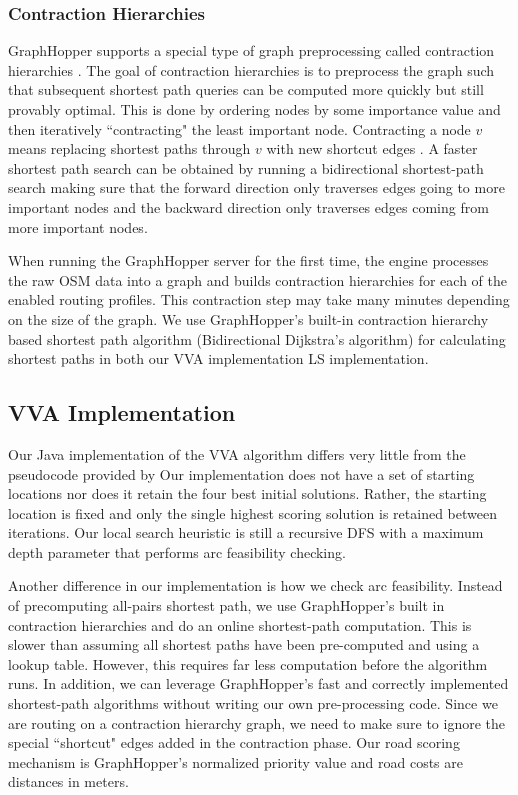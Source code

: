 \documentclass[honors]{union-cs-thesis}
\begin{document}
\subsubsection{Contraction Hierarchies}
GraphHopper supports a special type of graph preprocessing called contraction hierarchies \cite{graphhopper}. The goal of contraction hierarchies is to preprocess the graph such that subsequent shortest path queries can be computed more quickly but still provably optimal. This is done by ordering nodes by some importance value and then iteratively ``contracting" the least important node. Contracting a node $v$ means replacing shortest paths through $v$ with new shortcut edges \cite{geisberger2008contraction}. A faster shortest path search can be obtained by running a bidirectional shortest-path search making sure that the forward direction only traverses edges going to more important nodes and the backward direction only traverses edges coming from more important nodes.

When running the GraphHopper server for the first time, the engine processes the raw OSM data into a graph and builds contraction hierarchies for each of the enabled routing profiles. This contraction step may take many minutes depending on the size of the graph. We use GraphHopper's built-in contraction hierarchy based shortest path algorithm (Bidirectional Dijkstra's algorithm) for calculating shortest paths in both our VVA implementation LS implementation.

\subsection{VVA Implementation}
Our Java implementation of the VVA algorithm differs very little from the pseudocode provided by \citeauthor{verbeeck2014extension} Our implementation does not have a set of starting locations nor does it retain the four best initial solutions. Rather, the starting location is fixed and only the single highest scoring solution is retained between iterations. Our local search heuristic is still a recursive DFS with a maximum depth parameter that performs arc feasibility checking.

Another difference in our implementation is how we check arc feasibility. Instead of precomputing all-pairs shortest path, we use GraphHopper's built in contraction hierarchies and do an online shortest-path computation. This is slower than assuming all shortest paths have been pre-computed and using a lookup table. However, this requires far less computation before the algorithm runs. In addition, we can leverage GraphHopper's fast and correctly implemented shortest-path algorithms without writing our own pre-processing code. Since we are routing on a contraction hierarchy graph, we need to make sure to ignore the special ``shortcut" edges added in the contraction phase. Our road scoring mechanism is GraphHopper's normalized priority value and road costs are distances in meters.
\end{document}
